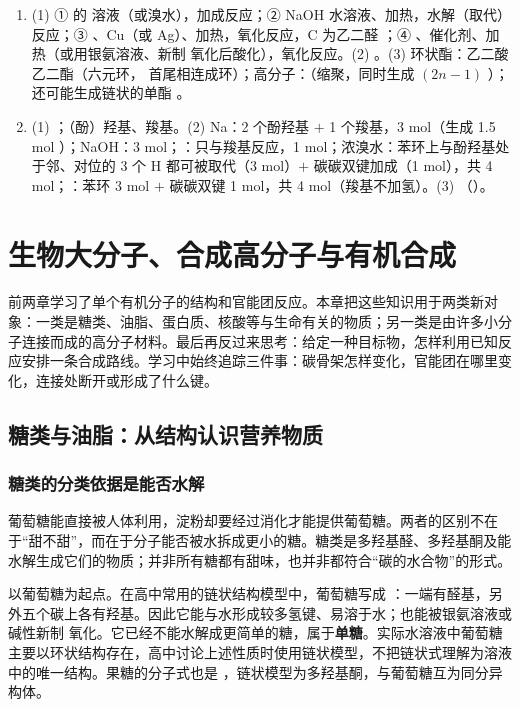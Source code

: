 \documentclass[UTF8,a4paper,zihao=5,oneside,openany,fontset=none]{ctexbook}
\newenvironment{jiexilist}{\small\begin{enumerate}[label={\textbf{\arabic*}.},leftmargin=1.6em,itemsep=0.3em,topsep=0.2em]}{\end{enumerate}}
\begin{document}
\begin{jiexilist}
\item (1) ①  的  溶液（或溴水），加成反应；② NaOH 水溶液、加热，水解（取代）反应；③ 、Cu（或 Ag）、加热，氧化反应，C 为乙二醛 ；④ 、催化剂、加热（或用银氨溶液、新制  氧化后酸化），氧化反应。(2) 。(3) 环状酯：乙二酸乙二酯（六元环， 首尾相连成环）；高分子：（缩聚，同时生成 $(2n-1)$ ）；还可能生成链状的单酯 。
\item (1) ；（酚）羟基、羧基。(2) Na：2 个酚羟基 $+$ 1 个羧基，3 mol（生成 1.5 mol ）；NaOH：3 mol；：只与羧基反应，1 mol；浓溴水：苯环上与酚羟基处于邻、对位的 3 个 H 都可被取代（3 mol）$+$ 碳碳双键加成（1 mol），共 4 mol；：苯环 3 mol $+$ 碳碳双键 1 mol，共 4 mol（羧基不加氢）。(3) （）。
\end{jiexilist}
\chapter{生物大分子、合成高分子与有机合成}

前两章学习了单个有机分子的结构和官能团反应。本章把这些知识用于两类新对象：一类是糖类、油脂、蛋白质、核酸等与生命有关的物质；另一类是由许多小分子连接而成的高分子材料。最后再反过来思考：给定一种目标物，怎样利用已知反应安排一条合成路线。学习中始终追踪三件事：碳骨架怎样变化，官能团在哪里变化，连接处断开或形成了什么键。

\section{糖类与油脂：从结构认识营养物质}

\subsection{糖类的分类依据是能否水解}
葡萄糖能直接被人体利用，淀粉却要经过消化才能提供葡萄糖。两者的区别不在于“甜不甜”，而在于分子能否被水拆成更小的糖。糖类是多羟基醛、多羟基酮及能水解生成它们的物质；并非所有糖都有甜味，也并非都符合“碳的水合物”的形式。

以葡萄糖为起点。在高中常用的链状结构模型中，葡萄糖写成 ：一端有醛基，另外五个碳上各有羟基。因此它能与水形成较多氢键、易溶于水；也能被银氨溶液或碱性新制  氧化。它已经不能水解成更简单的糖，属于\textbf{单糖}。实际水溶液中葡萄糖主要以环状结构存在，高中讨论上述性质时使用链状模型，不把链状式理解为溶液中的唯一结构。果糖的分子式也是 ，链状模型为多羟基酮，与葡萄糖互为同分异构体。
\end{document}
